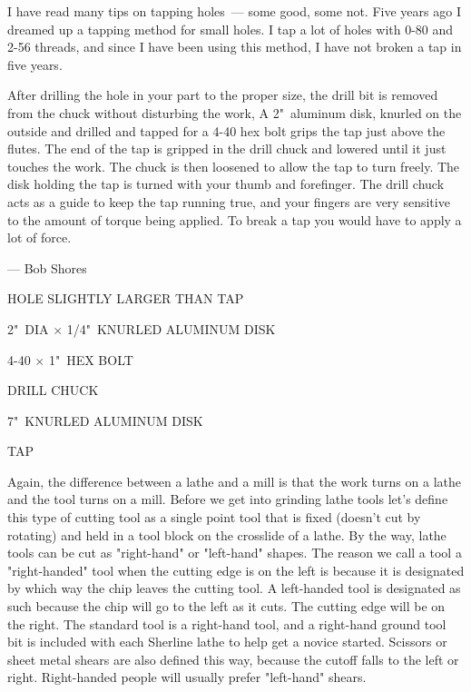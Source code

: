 
I have read many tips on tapping holes\ --- some good, some not. Five years ago
I dreamed up a tapping method for small holes. I tap a lot of holes with 0-80
and 2-56 threads, and since I have been using this method, I have not broken a
tap in five years.

After drilling the hole in your part to the proper size, the drill bit is
removed from the chuck without disturbing the work, A 2"\ aluminum disk, knurled
on the outside and drilled and tapped for a 4-40 hex bolt grips the tap just
above the flutes. The end of the tap is gripped in the drill chuck and lowered
until it just touches the work. The chuck is then loosened to allow the tap to
turn freely. The disk holding the tap is turned with your thumb and forefinger.
The drill chuck acts as a guide to keep the tap running true, and your fingers
are very sensitive to the amount of torque being applied. To break a tap you
would have to apply a lot of force.

\bigskip
--- Bob Shores
\bigskip

HOLE SLIGHTLY LARGER THAN TAP

2"\ DIA $\times$ 1/4"\ KNURLED ALUMINUM DISK

4-40 $\times$ 1"\ HEX BOLT

DRILL CHUCK

7"\ KNURLED ALUMINUM DISK

TAP
\bigskip

\secup

\secdown


Again, the difference between a lathe and a mill is that the work turns on a
lathe and the tool turns on a mill. Before we get into grinding lathe tools
let's define this type of cutting tool as a single point tool that is fixed
(doesn't cut by rotating) and held in a tool block on the crosslide of a lathe.
By the way, lathe tools can be cut as "right-hand" or "left-hand" shapes. The
reason we call a tool a "right-handed" tool when the cutting edge is on the left
is because it is designated by which way the chip leaves the cutting tool. A
left-handed tool is designated as such because the chip will go to the left as
it cuts. The cutting edge will be on the right. The standard tool is a
right-hand tool, and a right-hand ground tool bit is included with each Sherline
lathe to help get a novice started. Scissors or sheet metal shears are also
defined this way, because the cutoff falls to the left or right. Right-handed
people will usually prefer "left-hand" shears.

